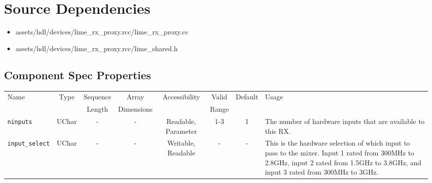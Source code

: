 \section*{Source Dependencies}
\begin{itemize}
	\item assets/hdl/devices/lime\_rx\_proxy.rcc/lime\_rx\_proxy.cc
	\item assets/hdl/devices/lime\_rx\_proxy.rcc/lime\_shared.h
\end{itemize}

\begin{landscape}
	\section*{Component Spec Properties}
	\begin{scriptsize}
		\begin{tabular}{|p{3cm}|c|c|c|c|c|c|p{10cm}|}
			\hline
			\rowcolor{blue}
			Name                          & Type   & Sequence & Array      & Accessibility       & Valid & Default & Usage                                                                                                                                                                                                                                                              \\
			\rowcolor{blue}
			                              &        & Length   & Dimensions &                     & Range &         &                                                                                                                                                                                                                                                                    \\
			\hline
			\verb+ninputs+                & UChar  & -        & -          & Readable, Parameter & 1-3   & 1       & The number of hardware inputs that are available to this RX.                                                                                                                                                                                                       \\
			\hline
			\verb+input_select+           & UChar  & -        & -          & Writable, Readable  & -     & -       & This is the hardware selection of which input to pass to the mixer. Input 1 rated from 300MHz to 2.8GHz, input 2 rated from 1.5GHz to 3.8GHz, and input 3 rated from 300MHz to 3GHz.                                                                               \\

\end{tabular}
\end{scriptsize}
\end{landscape}
